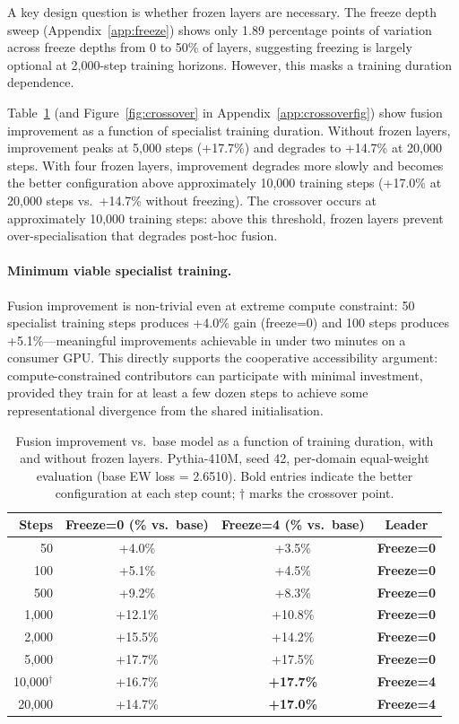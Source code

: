 \documentclass{article}
\begin{document}
A key design question is whether frozen layers are necessary. The freeze depth sweep (Appendix~\ref{app:freeze}) shows only 1.89 percentage points of variation across freeze depths from 0 to 50\% of layers, suggesting freezing is largely optional at 2,000-step training horizons. However, this masks a training duration dependence.

Table~\ref{tab:crossover} (and Figure~\ref{fig:crossover} in Appendix~\ref{app:crossoverfig}) show fusion improvement as a function of specialist training duration. Without frozen layers, improvement peaks at 5,000 steps (+17.7\%) and degrades to +14.7\% at 20,000 steps. With four frozen layers, improvement degrades more slowly and becomes the better configuration above approximately 10,000 training steps (+17.0\% at 20,000 steps vs.\ +14.7\% without freezing). The crossover occurs at approximately 10,000 training steps: above this threshold, frozen layers prevent over-specialisation that degrades post-hoc fusion.

\paragraph{Minimum viable specialist training.} Fusion improvement is non-trivial even at extreme compute constraint: 50 specialist training steps produces +4.0\% gain (freeze=0) and 100 steps produces +5.1\%---meaningful improvements achievable in under two minutes on a consumer GPU. This directly supports the cooperative accessibility argument: compute-constrained contributors can participate with minimal investment, provided they train for at least a few dozen steps to achieve some representational divergence from the shared initialisation.

\begin{table}[h]
\centering
\caption{Fusion improvement vs.\ base model as a function of training duration, with and without frozen layers. Pythia-410M, seed 42, per-domain equal-weight evaluation (base EW loss = 2.6510). Bold entries indicate the better configuration at each step count; $\dagger$ marks the crossover point.}
\label{tab:crossover}
\begin{tabular}{rccc}
\toprule
\textbf{Steps} & \textbf{Freeze=0} (\% vs.\ base) & \textbf{Freeze=4} (\% vs.\ base) & \textbf{Leader} \\
\midrule
50    & +4.0\%   & +3.5\%   & \textbf{Freeze=0} \\
100   & +5.1\%   & +4.5\%   & \textbf{Freeze=0} \\
500   & +9.2\%   & +8.3\%   & \textbf{Freeze=0} \\
1,000 & +12.1\%  & +10.8\%  & \textbf{Freeze=0} \\
2,000 & +15.5\%  & +14.2\%  & \textbf{Freeze=0} \\
5,000 & +17.7\%  & +17.5\%  & \textbf{Freeze=0} \\
10,000$^\dagger$ & +16.7\% & \textbf{+17.7\%} & \textbf{Freeze=4} \\
20,000 & +14.7\% & \textbf{+17.0\%} & \textbf{Freeze=4} \\
\bottomrule
\end{tabular}
\end{table}
\end{document}
